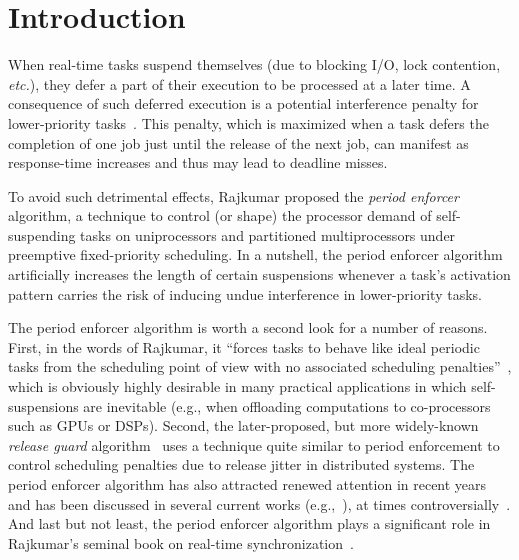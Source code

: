 


\section{Introduction} 
When real-time tasks suspend themselves (due to blocking I/O, lock contention, \textit{etc.}), they defer a part of their execution to be processed at a later time. A consequence of such deferred execution is a potential interference penalty for lower-priority tasks~\cite{LSS:87,LSST:91,Ra:90,ABRTW:93,SLS:95,WC16-suspend-DATE,ecrts15nelissen}. This penalty, which is maximized when a task defers the completion of one job just until the release of the next job, can manifest as response-time increases and thus may lead to deadline misses.

To avoid such detrimental effects,  Rajkumar \cite{Raj:suspension1991} proposed the \emph{period enforcer} algorithm,  a technique to control (or shape) the processor demand of self-suspending tasks on uniprocessors and partitioned multiprocessors under preemptive fixed-priority scheduling. In a nutshell, the period enforcer algorithm artificially increases the length of certain suspensions whenever a task's activation pattern carries the risk of inducing undue interference in lower-priority tasks. 

The period enforcer algorithm is worth a second look for a number of reasons. First, in the words of Rajkumar, it ``forces tasks to behave like ideal periodic tasks from the scheduling point of view with no associated scheduling penalties''~\cite{Raj:suspension1991}, which is obviously highly desirable in many practical applications in which self-suspensions are inevitable (e.g., when offloading computations to co-processors such as GPUs or DSPs). Second, the later-proposed, but more widely-known \emph{release guard} algorithm~\cite{SL:96} uses a technique quite similar to period enforcement to control scheduling penalties due to release jitter in distributed systems. The period enforcer algorithm has also attracted renewed attention in recent years and has been discussed in several current works  (e.g.,~\cite{DBLP:conf/rtss/ChenL14,LNR:09,LR:10,Lak:11,LC:14,KANR:13,HY:11,CA:09,CA:10,CA:10b}), at times controversially~\cite{BA:08a}. And last but not least, the period enforcer algorithm plays a significant role in Rajkumar's seminal book on   real-time  synchronization~\cite{Raj:91}. 


